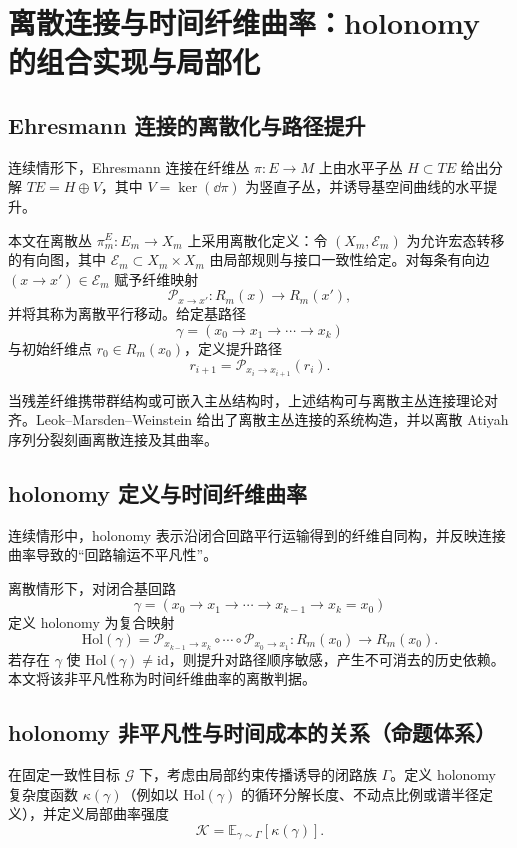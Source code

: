 \section{离散连接与时间纤维曲率：holonomy 的组合实现与局部化}

\subsection{Ehresmann 连接的离散化与路径提升}

连续情形下，Ehresmann 连接在纤维丛 $\pi:E\to M$ 上由水平子丛 $H\subset TE$ 给出分解 $TE=H\oplus V$，其中 $V=\ker(\dd\pi)$ 为竖直子丛，并诱导基空间曲线的水平提升。\cite{wikipedia_ehresmann_connection}

本文在离散丛 $\pi_m^{E}:E_m\to X_m$ 上采用离散化定义：令 $(X_m,\mathcal E_m)$ 为允许宏态转移的有向图，其中 $\mathcal E_m\subset X_m\times X_m$ 由局部规则与接口一致性给定。对每条有向边 $(x\to x')\in\mathcal E_m$ 赋予纤维映射
$$
\mathcal P_{x\to x'}:R_m(x)\to R_m(x'),
$$
并将其称为离散平行移动。给定基路径
$$
\gamma=(x_0\to x_1\to\cdots\to x_k)
$$
与初始纤维点 $r_0\in R_m(x_0)$，定义提升路径
$$
r_{i+1}=\mathcal P_{x_i\to x_{i+1}}(r_i).
$$

当残差纤维携带群结构或可嵌入主丛结构时，上述结构可与离散主丛连接理论对齐。Leok--Marsden--Weinstein 给出了离散主丛连接的系统构造，并以离散 Atiyah 序列分裂刻画离散连接及其曲率。\cite{leok_marsden_weinstein_discrete_connections}

\subsection{holonomy 定义与时间纤维曲率}

连续情形中，holonomy 表示沿闭合回路平行运输得到的纤维自同构，并反映连接曲率导致的“回路输运不平凡性”。\cite{wikipedia_holonomy}

离散情形下，对闭合基回路
$$
\gamma=(x_0\to x_1\to\cdots\to x_{k-1}\to x_k=x_0)
$$
定义 holonomy 为复合映射
$$
\mathrm{Hol}(\gamma)=\mathcal P_{x_{k-1}\to x_k}\circ\cdots\circ \mathcal P_{x_0\to x_1}:R_m(x_0)\to R_m(x_0).
$$
若存在 $\gamma$ 使 $\mathrm{Hol}(\gamma)\neq\mathrm{id}$，则提升对路径顺序敏感，产生不可消去的历史依赖。本文将该非平凡性称为时间纤维曲率的离散判据。

\subsection{holonomy 非平凡性与时间成本的关系（命题体系）}

在固定一致性目标 $\mathcal G$ 下，考虑由局部约束传播诱导的闭路族 $\Gamma$。定义 holonomy 复杂度函数 $\kappa(\gamma)$（例如以 $\mathrm{Hol}(\gamma)$ 的循环分解长度、不动点比例或谱半径定义），并定义局部曲率强度
$$
\mathcal K=\mathbb E_{\gamma\sim \Gamma}[\kappa(\gamma)].
$$

